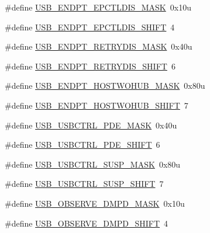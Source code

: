 \begin{DoxyCompactItemize}
\item 
\#define \hyperlink{group___u_s_b___register___masks_ga07f43f2be7e974a763e86087f47e14d6}{U\+S\+B\+\_\+\+E\+N\+D\+P\+T\+\_\+\+E\+P\+C\+T\+L\+D\+I\+S\+\_\+\+M\+A\+SK}~0x10u
\item 
\#define \hyperlink{group___u_s_b___register___masks_ga0607b1ed419fd16c0c3635042ff33fd4}{U\+S\+B\+\_\+\+E\+N\+D\+P\+T\+\_\+\+E\+P\+C\+T\+L\+D\+I\+S\+\_\+\+S\+H\+I\+FT}~4
\item 
\#define \hyperlink{group___u_s_b___register___masks_ga116b045c1163bccc05a270beb6ee2f3d}{U\+S\+B\+\_\+\+E\+N\+D\+P\+T\+\_\+\+R\+E\+T\+R\+Y\+D\+I\+S\+\_\+\+M\+A\+SK}~0x40u
\item 
\#define \hyperlink{group___u_s_b___register___masks_ga7d07ae7b5369ee4cbfa19194ebc2e143}{U\+S\+B\+\_\+\+E\+N\+D\+P\+T\+\_\+\+R\+E\+T\+R\+Y\+D\+I\+S\+\_\+\+S\+H\+I\+FT}~6
\item 
\#define \hyperlink{group___u_s_b___register___masks_ga34644591d90c80611273ef5561529c34}{U\+S\+B\+\_\+\+E\+N\+D\+P\+T\+\_\+\+H\+O\+S\+T\+W\+O\+H\+U\+B\+\_\+\+M\+A\+SK}~0x80u
\item 
\#define \hyperlink{group___u_s_b___register___masks_ga3d502bcb3115f9bc7918b5fc67d42337}{U\+S\+B\+\_\+\+E\+N\+D\+P\+T\+\_\+\+H\+O\+S\+T\+W\+O\+H\+U\+B\+\_\+\+S\+H\+I\+FT}~7
\item 
\#define \hyperlink{group___u_s_b___register___masks_ga7fb8345a32022ec5df5129278d1aed30}{U\+S\+B\+\_\+\+U\+S\+B\+C\+T\+R\+L\+\_\+\+P\+D\+E\+\_\+\+M\+A\+SK}~0x40u
\item 
\#define \hyperlink{group___u_s_b___register___masks_gaaf556df66acd4f6ff2bc1f4fad1a05ed}{U\+S\+B\+\_\+\+U\+S\+B\+C\+T\+R\+L\+\_\+\+P\+D\+E\+\_\+\+S\+H\+I\+FT}~6
\item 
\#define \hyperlink{group___u_s_b___register___masks_gac65859ca12bfe997afc67545c8b1a052}{U\+S\+B\+\_\+\+U\+S\+B\+C\+T\+R\+L\+\_\+\+S\+U\+S\+P\+\_\+\+M\+A\+SK}~0x80u
\item 
\#define \hyperlink{group___u_s_b___register___masks_ga44772d68648a57e6341ceec7fd5268f3}{U\+S\+B\+\_\+\+U\+S\+B\+C\+T\+R\+L\+\_\+\+S\+U\+S\+P\+\_\+\+S\+H\+I\+FT}~7
\item 
\#define \hyperlink{group___u_s_b___register___masks_ga796850497f75cc88772d3826d1196a43}{U\+S\+B\+\_\+\+O\+B\+S\+E\+R\+V\+E\+\_\+\+D\+M\+P\+D\+\_\+\+M\+A\+SK}~0x10u
\item 
\#define \hyperlink{group___u_s_b___register___masks_ga044fcfc292ba6db33ec4e847a6510440}{U\+S\+B\+\_\+\+O\+B\+S\+E\+R\+V\+E\+\_\+\+D\+M\+P\+D\+\_\+\+S\+H\+I\+FT}~4
\item 

\end{DoxyCompactItemize}
